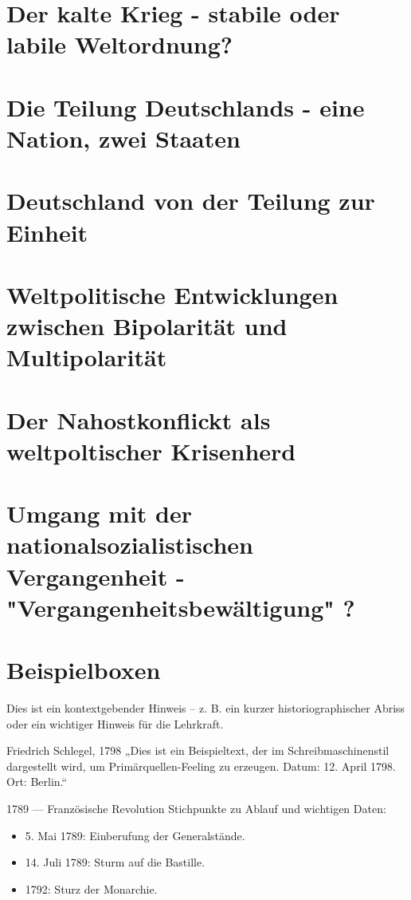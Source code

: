 \documentclass[11pt,a4paper,oneside]{article}
\begin{document}
	
	\newpage
	
	
	\section{Der kalte Krieg - stabile oder labile Weltordnung?}
	\section{Die Teilung Deutschlands - eine Nation, zwei Staaten}
	\section{Deutschland von der Teilung zur Einheit}
	\section{Weltpolitische Entwicklungen zwischen Bipolarität und Multipolarität}
	\section{Der Nahostkonflickt als weltpoltischer Krisenherd}
	\section{Umgang mit der nationalsozialistischen Vergangenheit - "Vergangenheitsbewältigung" ?}
	
	\newpage
	
	\section{Beispielboxen}
	
	\begin{histnote}
		Dies ist ein kontextgebender Hinweis – z. B. ein kurzer historiographischer Abriss oder ein wichtiger Hinweis für die Lehrkraft.
	\end{histnote}

	
	\begin{primarysource}{Friedrich Schlegel, 1798}
		„Dies ist ein Beispieltext, der im Schreibmaschinenstil dargestellt wird, um Primärquellen-Feeling zu erzeugen.
		Datum: 12. April 1798. Ort: Berlin.“
	\end{primarysource}
	
	\begin{timeline}{1789 — Französische Revolution}
		Stichpunkte zu Ablauf und wichtigen Daten:
		\begin{itemize}
			\item 5. Mai 1789: Einberufung der Generalstände.
			\item 14. Juli 1789: Sturm auf die Bastille.
			\item 1792: Sturz der Monarchie.
		\end{itemize}
	\end{timeline}
	
\end{document}
